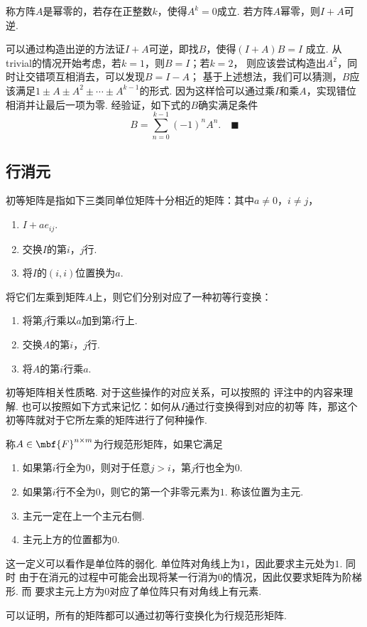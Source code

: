   \begin{thm}
    称方阵$A$是幂零的，若存在正整数$k$，使得$A^k=0$成立.
    若方阵$A$幂零，则$I+A$可逆.
  \end{thm}
  \proof
    可以通过构造出逆的方法证$I+A$可逆，即找$B$，使得$(I+A)B=I$
    成立. 从trivial的情况开始考虑，若$k=1$，则$B=I$；若$k=2$，
    则应该尝试构造出$A^2$，同时让交错项互相消去，可以发现$B=I-A$；
    基于上述想法，我们可以猜测，$B$应该满足$1\pm A\pm A^2\pm\cdots
    \pm A^{k-1}$的形式. 因为这样恰可以通过乘$I$和乘$A$，实现错位
    相消并让最后一项为零. 经验证，如下式的$B$确实满足条件
    \[
      B=\sum_{n=0}^{k-1}(-1)^nA^n.\quad\blacksquare
    \]

\subsection{行消元}

  \begin{defi}
    初等矩阵是指如下三类同单位矩阵十分相近的矩阵：其中$a\ne0$，$i\ne j$，
    \begin{enumerate}
      \item $I+ae_{ij}$.
      \item 交换$I$的第$i$，$j$行.
      \item 将$I$的$(i, i)$位置换为$a$.
    \end{enumerate}
    将它们左乘到矩阵$A$上，则它们分别对应了一种初等行变换：
    \begin{enumerate}
      \item 将第$j$行乘以$a$加到第$i$行上.
      \item 交换$A$的第$i$，$j$行.
      \item 将$A$的第$i$行乘$a$.
    \end{enumerate}
  \end{defi}
  \remark
    初等矩阵相关性质略. 对于这些操作的对应关系，可以按照的
    评注中的内容来理解. 也可以按照如下方式来记忆：如何从$I$通过行变换得到对应的初等
    阵，那这个初等阵就对于它所左乘的矩阵进行了何种操作.

  \begin{defi}
    称$A\in\mbf{F}^{n\times m}$为行规范形矩阵，如果它满足
    \begin{enumerate}
      \item 如果第$i$行全为$0$，则对于任意$j>i$，第$j$行也全为$0$.
      \item 如果第$i$行不全为$0$，则它的第一个非零元素为$1$. 称该位置为主元.
      \item 主元一定在上一个主元右侧.
      \item 主元上方的位置都为$0$.
    \end{enumerate}
  \end{defi}
  \remark
    这一定义可以看作是单位阵的弱化. 单位阵对角线上为$1$，因此要求主元处为$1$. 同时
    由于在消元的过程中可能会出现将某一行消为$0$的情况，因此仅要求矩阵为阶梯形. 而
    要求主元上方为$0$对应了单位阵只有对角线上有元素.\par
    可以证明，所有的矩阵都可以通过初等行变换化为行规范形矩阵.

